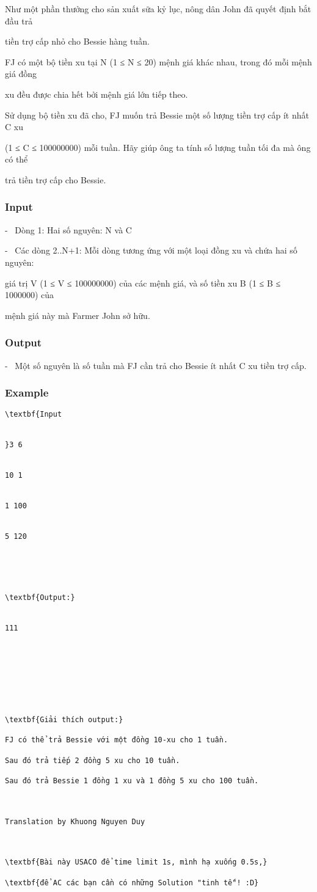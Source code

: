 



   Như một phần thưởng cho sản xuất sữa kỷ lục, nông dân John đã quyết định bắt đầu trả  

   tiền trợ cấp nhỏ cho Bessie hàng tuần.  

   FJ có một bộ tiền xu tại N (1 ≤ N ≤ 20) mệnh giá khác nhau, trong đó mỗi mệnh giá đồng  

   xu đều được chia hết bởi mệnh giá lớn tiếp theo.  

   Sử dụng bộ tiền xu đã cho, FJ muốn trả Bessie một số lượng tiền trợ cấp ít nhất C xu  

   (1 ≤ C ≤ 100000000) mỗi tuần. Hãy giúp ông ta tính số lượng tuần tối đa mà ông có thể  

   trả tiền trợ cấp cho Bessie.  

\subsubsection{   Input  }

   -  Dòng 1: Hai số nguyên: N và C  

   -  Các dòng 2..N+1: Mỗi dòng tương ứng với một loại đồng xu và chứa hai số nguyên:  

   giá trị V (1 ≤ V ≤ 100000000) của các mệnh giá, và số tiền xu B (1 ≤ B ≤ 1000000) của  

   mệnh giá này mà Farmer John sở hữu.  

\subsubsection{   Output  }

   -  Một số nguyên là số tuần mà FJ cần trả cho Bessie ít nhất C xu tiền trợ cấp.  

\subsubsection{   Example  }
\begin{verbatim}
\textbf{Input


}3 6


10 1


1 100


5 120





\textbf{Output:}


111








\textbf{Giải thích output:}

FJ có thể trả Bessie với một đồng 10-xu cho 1 tuần.

Sau đó trả tiếp 2 đồng 5 xu cho 10 tuần.

Sau đó trả Bessie 1 đồng 1 xu và 1 đồng 5 xu cho 100 tuần.

 

Translation by Khuong Nguyen Duy

 

\textbf{Bài này USACO để time limit 1s, mình hạ xuống 0.5s,}

\textbf{để AC các bạn cần có những Solution "tinh tế"! :D}\end{verbatim}

